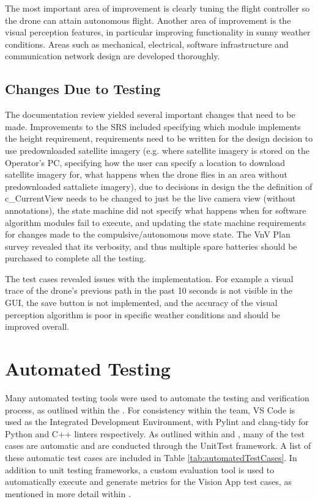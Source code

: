 \documentclass[12pt, titlepage]{article}
\begin{document}
The most important area of improvement is clearly tuning the flight controller so the drone can attain autonomous flight. Another area of improvement is the visual perception features, in particular improving functionality in sunny weather conditions. Areas such as mechanical, electrical, software infrastructure and communication network design are developed thoroughly. 

\subsection{Changes Due to Testing}

The documentation review yielded several important changes that need to be made. Improvements to the SRS included specifying which module implements the height requirement, requirements need to be written for the design decision to use predownloaded satellite imagery (e.g. where satellite imagery is stored on the Operator's PC, specifying how the user can specify a location to download satellite imagery for, what happens when the drone flies in an area without predownloaded sattaliete imagery), due to decisions in design the the definition of c\_CurrentView needs to be changed to just be the live camera view (without annotations), the state machine did not specify what happens when for software algorithm modules fail to execute, and updating the state machine requirements for changes made to the compulsive/autonomous move state. The VnV Plan survey revealed that its verbosity, and thus multiple spare batteries should be purchased to complete all the testing.

The test cases revealed issues with the implementation. For example a visual trace of the drone's previous path in the past 10 seconds is not visible in the GUI, the save button is not implemented, and the accuracy of the visual perception algorithm is poor in specific weather conditions and should be improved overall.

\section{Automated Testing}

Many automated testing tools were used to automate the testing and verification process, as outlined within the . For consistency within the team, VS Code is used as the Integrated Development Environment, with Pylint and clang-tidy for Python and C++ linters respectively. As outlined within  and , many of the test cases are automatic and are conducted through the UnitTest framework. A list of these automatic test cases are included in Table \ref{tab:automatedTestCases}. In addition to unit testing frameworks, a custom evaluation tool is used to automatically execute and generate metrics for the Vision App test cases, as mentioned in more detail within . 
\end{document}
